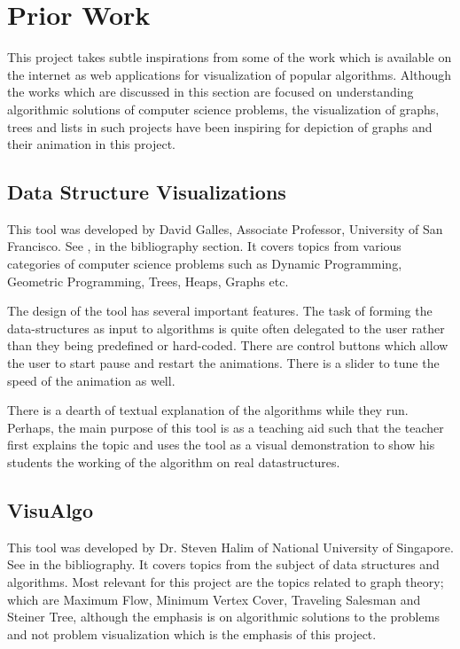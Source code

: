 \section{Prior Work}
This project takes subtle inspirations from some of the work which is available
on the internet as web applications for visualization of popular algorithms.
Although the works which are discussed in this section are focused on
understanding algorithmic solutions of computer science problems, the
visualization of graphs, trees and lists in such projects have been inspiring
for depiction of graphs and their animation in this project.

\subsection{Data Structure Visualizations}
\label{priorWork: datastrucvisu}
This tool was developed by David Galles, Associate Professor, University of San
Francisco. See \cite{Galles}, in the bibliography section.  It covers topics
from various categories of computer science problems such as Dynamic
Programming, Geometric Programming, Trees, Heaps, Graphs etc.

The design of the tool has several important features.  The task of forming the
data-structures as input to algorithms is quite often delegated to the user
rather than they being predefined or hard-coded.  There are control buttons
which allow the user to start pause and restart the animations. There is a
slider to tune the speed of the animation as well.

There is a dearth of textual explanation of the algorithms while they run.
Perhaps, the main purpose of this tool is as a teaching aid such that the
teacher first explains the topic and uses the tool as a visual demonstration to
show his students the working of the algorithm on real datastructures.

\subsection{VisuAlgo}
\label{priorWork: visualgo}
This tool was developed by Dr. Steven Halim of National University of
Singapore. See \cite{HalimVisu} in the bibliography. It covers topics from the
subject of data structures and algorithms. Most relevant for this project are
the topics related to graph theory; which are Maximum Flow, Minimum Vertex
Cover, Traveling Salesman and Steiner Tree, although the emphasis is on
algorithmic solutions to the problems and not problem visualization which is
the emphasis of this project.


